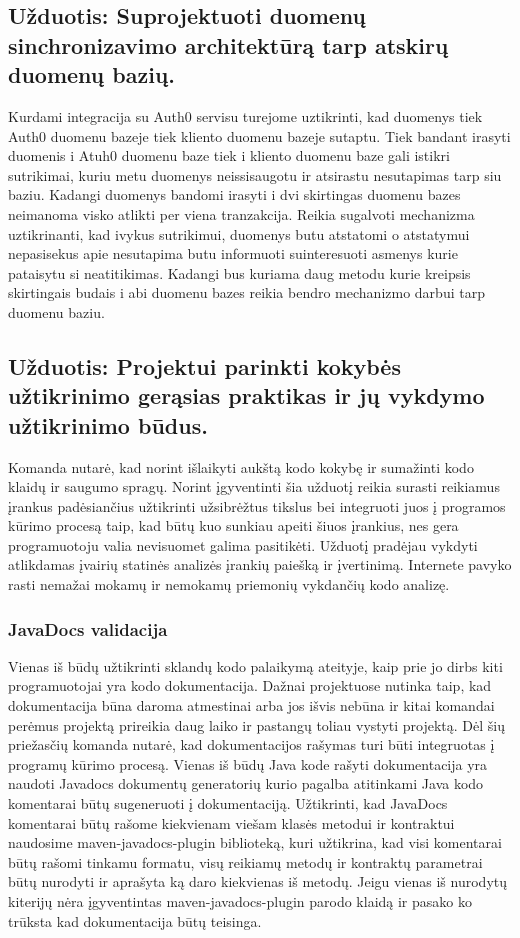 \documentclass{VUMIFPSkursinis}
\begin{document}
	\subsection{Užduotis: Suprojektuoti duomenų sinchronizavimo architektūrą tarp atskirų duomenų bazių.}
		Kurdami integracija su Auth0 servisu turejome uztikrinti, kad duomenys tiek Auth0 duomenu bazeje tiek kliento duomenu bazeje sutaptu.
		Tiek bandant irasyti duomenis i Atuh0 duomenu baze tiek i kliento duomenu baze gali istikri sutrikimai, kuriu metu duomenys neissisaugotu ir atsirastu nesutapimas tarp siu baziu.
		Kadangi duomenys bandomi irasyti i dvi skirtingas duomenu bazes neimanoma visko atlikti per viena tranzakcija.
		Reikia sugalvoti mechanizma uztikrinanti, kad ivykus sutrikimui, duomenys butu atstatomi o atstatymui nepasisekus apie nesutapima butu informuoti suinteresuoti asmenys kurie pataisytu 
		si neatitikimas.
		Kadangi bus kuriama daug metodu kurie kreipsis skirtingais budais i abi duomenu bazes reikia bendro mechanizmo darbui tarp duomenu baziu.
		


	\subsection{Užduotis: Projektui parinkti kokybės užtikrinimo gerąsias praktikas ir jų vykdymo užtikrinimo būdus.}
		Komanda nutarė, kad norint išlaikyti aukštą kodo kokybę ir sumažinti kodo klaidų ir saugumo spragų.
		Norint įgyventinti šia užduotį reikia surasti reikiamus įrankus padėsiančius užtikrinti užsibrėžtus tikslus bei integruoti juos į programos kūrimo
		procesą taip, kad būtų kuo sunkiau apeiti šiuos įrankius, nes gera programuotoju valia nevisuomet galima pasitikėti.
		Užduotį pradėjau vykdyti atlikdamas įvairių statinės analizės įrankių paiešką ir įvertinimą.
		Internete pavyko rasti nemažai mokamų ir nemokamų priemonių vykdančių kodo analizę.
		
		\subsubsection{JavaDocs validacija}
			Vienas iš būdų užtikrinti sklandų kodo palaikymą ateityje, kaip prie jo dirbs kiti programuotojai yra kodo dokumentacija.
			Dažnai projektuose nutinka taip, kad dokumentacija būna daroma atmestinai arba jos išvis nebūna ir kitai komandai perėmus projektą prireikia daug 
			laiko ir pastangų toliau vystyti projektą.
			Dėl šių priežasčių komanda nutarė, kad dokumentacijos rašymas turi būti integruotas į programų kūrimo procesą.
			Vienas iš būdų Java kode rašyti dokumentacija yra naudoti Javadocs dokumentų generatorių kurio pagalba atitinkami Java kodo komentarai būtų 
			sugeneruoti į dokumentaciją. Užtikrinti, kad JavaDocs komentarai būtų rašome kiekvienam viešam klasės metodui ir kontraktui naudosime  maven-javadocs-plugin biblioteką, kuri užtikrina, kad visi komentarai būtų rašomi tinkamu formatu, visų reikiamų metodų ir kontraktų parametrai būtų nurodyti ir aprašyta ką daro kiekvienas iš metodų.
			Jeigu vienas iš nurodytų kiterijų nėra įgyventintas maven-javadocs-plugin parodo klaidą ir pasako ko trūksta kad dokumentacija būtų teisinga.
\end{document}
